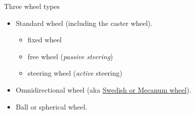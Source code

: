 \documentclass[compress]{beamer}
\begin{document}
\begin{frame}{Three wheel types}

\begin{itemize}
    \item Standard wheel (including the caster wheel).
        \begin{itemize}
            \item fixed wheel
            \item free wheel (\emph{passive steering})
            \item steering wheel (\emph{active} steering)
        \end{itemize}
    \item Omnidirectional wheel (aka \href{http://en.wikipedia.org/wiki/Mecanum_wheel}{Swedish or Mecanum wheel}).
    \item Ball or spherical wheel.
\end{itemize}

\end{frame}
\end{document}
